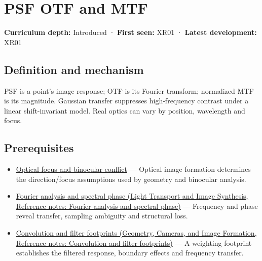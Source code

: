\hypertarget{appendix-8b76b0efd27f}{}\label{referencestart:appendix-8b76b0efd27f}
\section{PSF OTF and MTF}\label{appendix-8b76b0efd27f-psf-otf-and-mtf}

\hypertarget{appendix-8b76b0efd27f-psf-otf-and-mtf}{}

\textbf{Curriculum depth:} Introduced · \textbf{First seen:} XR01 · \textbf{Latest development:} XR01

\begin{allmightroledefinition}

\subsection{Definition and mechanism}\label{appendix-8b76b0efd27f-definition-and-mechanism}

\hypertarget{appendix-8b76b0efd27f-definition-and-mechanism}{}

PSF is a point's image response; OTF is its Fourier transform; normalized MTF is its magnitude. Gaussian transfer suppresses high-frequency contrast under a linear shift-invariant model. Real optics can vary by position, wavelength and focus.

\end{allmightroledefinition}

\subsection{Prerequisites}\label{appendix-8b76b0efd27f-prerequisites}

\hypertarget{appendix-8b76b0efd27f-prerequisites}{}

\begin{itemize}
\tightlist
\item
  \hyperref[appendix-f90cee1be7a4]{Optical focus and binocular conflict} --- Optical image formation determines the direction/focus assumptions used by geometry and binocular analysis.
\item
  \href{../04-Light-Transport-and-Image-Synthesis/main.pdf\#nameddest=appendix-b60686ba06a1}{Fourier analysis and spectral phase (Light Transport and Image Synthesis, Reference notes: Fourier analysis and spectral phase)} --- Frequency and phase reveal transfer, sampling ambiguity and structural loss.
\item
  \href{../03-Geometry-Cameras-and-Image-Formation/main.pdf\#nameddest=appendix-d5b3c692d9f0}{Convolution and filter footprints (Geometry, Cameras, and Image Formation, Reference notes: Convolution and filter footprints)} --- A weighting footprint establishes the filtered response, boundary effects and frequency transfer.
\end{itemize}

